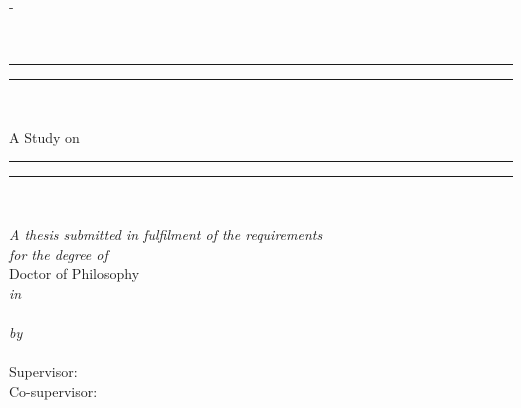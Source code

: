 \begin{titlingpage}

{
\SingleSpace
\calccentering{\unitlength} 
\begin{adjustwidth*}{\unitlength}{-\unitlength}
\begin{center}

~\\

\rule[0.5ex]{\linewidth}{2pt}\vspace*{-\baselineskip}\vspace*{3.2pt}
\rule[0.5ex]{\linewidth}{1pt}\\%
\noindent

{\Large A Study on\par}
\vspace{0.25cm}
{\huge
\parbox{1.0\linewidth}{%
  \centering
  \setlength{\baselineskip}{26pt}%
  \utstitle\par
}}
\vspace{1.5mm}



\rule[0.5ex]{\linewidth}{1pt}\vspace*{-\baselineskip}\vspace{4pt}
\rule[0.5ex]{\linewidth}{2pt}\\
\vspace {15mm}

\emph{\normalsize A thesis submitted in fulfilment of the requirements}\\
\vspace {0.1in}
\emph{\normalsize for the degree of}\\
\vspace {10mm}
{\normalsize Doctor of Philosophy}\\
\vspace{0mm}
\emph{in}\\
\vspace{0mm}
{\normalsize \utsfield}\\
\vspace {10mm}
\emph{\normalsize by}\\
\vspace{4mm}
{\bfseries \large \utsname} \\ %

\vspace {10mm}
{\normalsize Supervisor: \utssupervisor}\\
{\normalsize Co-supervisor: \utscosupervisor}\\


\end{center}
\end{adjustwidth*}}
\end{titlingpage}
